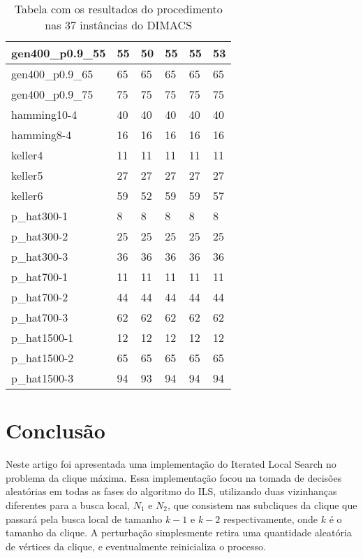 \documentclass{article}
\begin{document}
\begin{center}
\begin{table}
\begin{tabular}{| l | l | l | l | l | l |}
gen400\_p0.9\_55	&	55			&50			&55				&55				&53\\ \hline
gen400\_p0.9\_65	&	65			&65			&65				&65				&65\\ \hline
gen400\_p0.9\_75	&	75			&75			&75				&75				&75\\ \hline
hamming10-4		&	40			&40			&40				&40				&40\\ \hline
hamming8-4			&	16			&16			&16				&16				&16\\ \hline
keller4				&	11			&11			&11				&11				&11\\ \hline
keller5				&	27			&27			&27				&27				&27\\ \hline
keller6				&	59			&52			&59				&59				&57\\ \hline
p\_hat300-1			&	8			&8 			&8				&8				&8\\ \hline
p\_hat300-2			&	25			&25			&25				&25				&25\\ \hline
p\_hat300-3			&	36			&36			&36				&36				&36\\ \hline
p\_hat700-1			&	11			&11			&11				&11				&11\\ \hline
p\_hat700-2			&	44			&44			&44				&44				&44\\ \hline
p\_hat700-3			&	62			&62			&62				&62				&62\\ \hline
p\_hat1500-1		&	12			&12			&12				&12				&12\\ \hline
p\_hat1500-2		&	65			&65			&65				&65				&65\\ \hline
p\_hat1500-3		&	94			&93			&94				&94				&94\\ \hline
    \hline
\end{tabular}
\caption{Tabela com os resultados do procedimento nas 37 instâncias do DIMACS}
\end{table}
\end{center}

\section{Conclusão}

Neste artigo foi apresentada uma implementação do Iterated Local Search no problema da clique máxima. Essa implementação focou na tomada de decisões aleatórias em todas as fases do algoritmo do ILS, utilizando duas vizinhanças diferentes para a busca local, $N_1$ e $N_2$, que consistem nas subcliques da clique que passará pela busca local de tamanho $k-1$ e $k-2$ respectivamente, onde $k$ é o tamanho da clique. A perturbação simplesmente retira uma quantidade aleatória de vértices da clique, e eventualmente reinicializa o processo.\par
\end{document}
